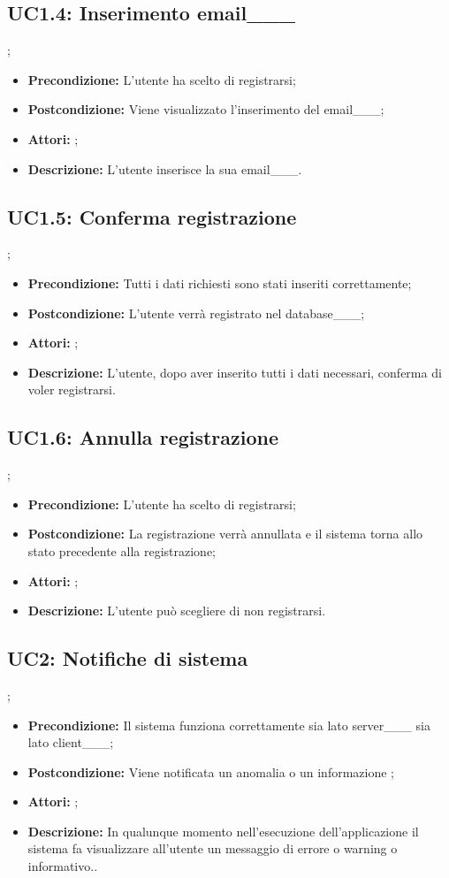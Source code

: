 \subsection{ UC1.4: Inserimento email___}
;
\begin{itemize}
	\item \textbf{Precondizione:} L'utente ha scelto di registrarsi;
	\item \textbf{Postcondizione:} Viene visualizzato l'inserimento del email___;
	\item \textbf{Attori:} ;
	\item \textbf{Descrizione:} L'utente inserisce la sua email___.
\end{itemize}
\subsection{ UC1.5: Conferma registrazione}
;
\begin{itemize}
	\item \textbf{Precondizione:} Tutti i dati richiesti sono stati inseriti correttamente;
	\item \textbf{Postcondizione:} L'utente verrà registrato nel database___;
	\item \textbf{Attori:} ;
	\item \textbf{Descrizione:} L'utente, dopo aver inserito tutti i dati necessari,  conferma di voler registrarsi.
\end{itemize}
\subsection{ UC1.6: Annulla registrazione}
;
\begin{itemize}
	\item \textbf{Precondizione:} L'utente ha scelto di registrarsi;
	\item \textbf{Postcondizione:} La registrazione verrà annullata e il sistema torna allo stato precedente alla registrazione;
	\item \textbf{Attori:} ;
	\item \textbf{Descrizione:} L'utente può scegliere di non registrarsi.
\end{itemize}
\subsection{ UC2: Notifiche di sistema}
;
\begin{itemize}
	\item \textbf{Precondizione:} Il sistema funziona correttamente sia lato server___ sia lato client___;
	\item \textbf{Postcondizione:} Viene notificata un anomalia o un informazione ;
	\item \textbf{Attori:} ;
	\item \textbf{Descrizione:} In qualunque momento nell'esecuzione dell'applicazione il sistema fa visualizzare all'utente un messaggio di errore o warning o informativo..
\end{itemize}
